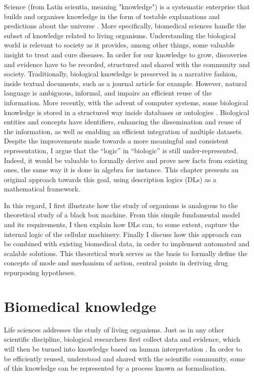 Science (from Latin scientia, meaning "knowledge") is a systematic enterprise that builds and organises knowledge in the form of testable explanations and predictions about the universe \citep{sciencewiki}. More specifically, biomedical sciences handle the subset of knowledge related to living organisms. Understanding the biological world is relevant to society as it provides, among other things, some valuable insight to treat and cure diseases. In order for our knowledge to grow, discoveries and evidence have to be recorded, structured and shared with the community and society. Traditionally, biological knowledge is preserved in a narrative fashion, inside textual documents, such as a journal article for example. However, natural language is ambiguous, informal, and impairs an efficient reuse of the information. More recently, with the advent of computer systems, some biological knowledge is stored in a structured way inside databases or ontologies \citep{brooksbank2014european}. Biological entities and concepts have identifiers, enhancing the dissemination and reuse of the information, as well as enabling an efficient integration of multiple datasets. Despite the improvements made towards a more meaningful and consistent representation, I argue that the “logic” in “biologic” is still under-represented. Indeed, it would be valuable to formally derive and prove new facts from existing ones, the same way it is done in algebra for instance. This chapter presents an original approach towards this goal, using description logics (DLs) as a mathematical framework.

In this regard, I first illustrate how the study of organisms is analogous to the theoretical study of a black box machine. From this simple fundamental model and its requirements, I then explain how DLs can, to some extent, capture the internal logic of the cellular machinery. Finally I discuss how this approach can be combined with existing biomedical data, in order to implement automated and scalable solutions. This theoretical work serves as the basis to formally define the concepts of mode and mechanism of action, central points in deriving drug repurposing hypotheses.

\section{Biomedical knowledge}

Life sciences addresses the study of living organisms. Just as in any other scientific discipline, biological researchers first collect data and evidence, which will then be turned into knowledge based on human interpretation \citep{antezana2009biological}. In order to be efficiently reused, understood and shared with the scientific community, some of this knowledge can be represented by a process known as formalisation.

